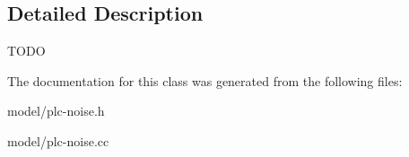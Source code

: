\subsection{\-Detailed \-Description}
\-T\-O\-D\-O 

\-The documentation for this class was generated from the following files\-:\begin{DoxyCompactItemize}
\item 
model/plc-\/noise.\-h\item 
model/plc-\/noise.\-cc\end{DoxyCompactItemize}
